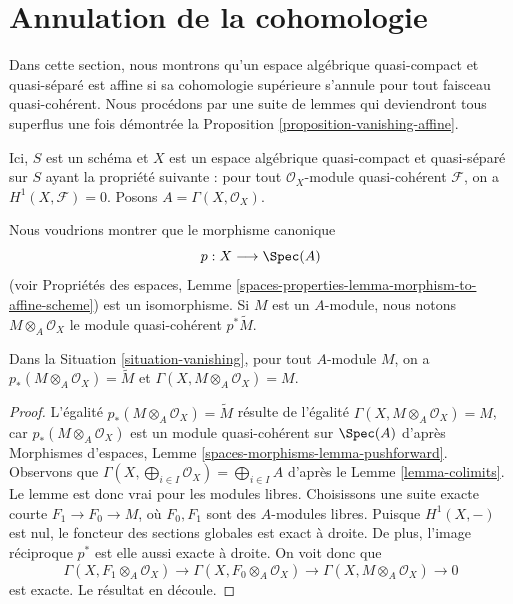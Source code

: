 \section{Annulation de la cohomologie}
\label{section-vanishing}

\noindent
Dans cette section, nous montrons qu'un espace algébrique quasi-compact et quasi-séparé
est affine si sa cohomologie supérieure s'annule
pour tout faisceau quasi-cohérent. Nous procédons par une suite de lemmes
qui deviendront tous superflus une fois démontrée la
Proposition \ref{proposition-vanishing-affine}.

\begin{situation}
\label{situation-vanishing}
Ici, $S$ est un schéma et $X$ est un espace algébrique quasi-compact et quasi-séparé
sur $S$ ayant la propriété suivante : pour tout
$\mathcal{O}_X$-module quasi-cohérent $\mathcal{F}$, on a
$H^1(X, \mathcal{F}) = 0$. Posons $A = \Gamma(X, \mathcal{O}_X)$.
\end{situation}

\noindent
Nous voudrions montrer que le morphisme canonique
$$
p : X \longrightarrow \Spec(A)
$$
(voir Propriétés des espaces, Lemme
\ref{spaces-properties-lemma-morphism-to-affine-scheme}) est un isomorphisme.
Si $M$ est un $A$-module, nous notons $M \otimes_A \mathcal{O}_X$
le module quasi-cohérent $p^*\tilde M$.

\begin{lemma}
\label{lemma-vanishing-compute}
Dans la Situation \ref{situation-vanishing}, pour tout $A$-module $M$, on a
$p_*(M \otimes_A \mathcal{O}_X) = \widetilde{M}$ et
$\Gamma(X, M \otimes_A \mathcal{O}_X) = M$.
\end{lemma}

\begin{proof}
L'égalité $p_*(M \otimes_A \mathcal{O}_X) = \widetilde{M}$ résulte
de l'égalité $\Gamma(X, M \otimes_A \mathcal{O}_X) = M$, car
$p_*(M \otimes_A \mathcal{O}_X)$ est un module quasi-cohérent sur
$\Spec(A)$ d'après Morphismes d'espaces, Lemme
\ref{spaces-morphisms-lemma-pushforward}.
Observons que $\Gamma(X, \bigoplus_{i \in I} \mathcal{O}_X) =
\bigoplus_{i \in I} A$ d'après le Lemme \ref{lemma-colimits}. Le
lemme est donc vrai pour les modules libres. Choisissons une suite exacte courte
$F_1 \to F_0 \to M$, où $F_0, F_1$ sont des $A$-modules libres. Puisque
$H^1(X, -)$ est nul, le foncteur des sections globales est exact à droite.
De plus, l'image réciproque $p^*$ est elle aussi exacte à droite. On voit donc
que
$$
\Gamma(X, F_1 \otimes_A \mathcal{O}_X) \to
\Gamma(X, F_0 \otimes_A \mathcal{O}_X) \to
\Gamma(X, M \otimes_A \mathcal{O}_X) \to 0
$$
est exacte. Le résultat en découle.
\end{proof}

